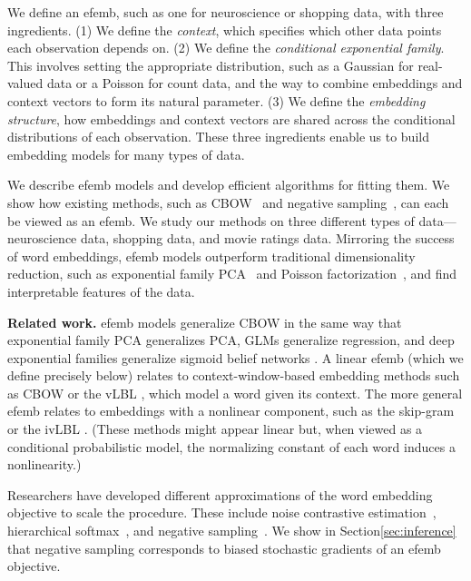 \documentclass[12pt]{article}
\DeclareRobustCommand{\parhead}[1]{\vspace{0.05in} \textbf{#1} }
\begin{document}
We define an \gls{efemb}, such as one for neuroscience or shopping
data, with three ingredients. (1) We define the \textit{context},
which specifies which other data points each observation depends
on. (2) We define the \textit{conditional exponential family}. This
involves setting the appropriate distribution, such as a Gaussian for
real-valued data or a Poisson for count data, and the way to combine
embeddings and context vectors to form its natural parameter.  (3) We
define the \textit{embedding structure}, how embeddings and context
vectors are shared across the conditional distributions of each
observation.  These three ingredients enable us to build embedding
models for many types of data.

We describe \gls{efemb} models and develop efficient algorithms for
fitting them. We show how existing methods, such as
\gls{CBOW}~\citep{mikolov2013efficient} and negative
sampling~\citep{mikolov2013distributed}, can each be viewed as an
\gls{efemb}. We study our methods on three different types of
data---neuroscience data, shopping data, and movie ratings data.
Mirroring the success of word embeddings, \gls{efemb} models
outperform traditional dimensionality reduction, such as exponential family
\gls{PCA}~\citep{collins2001generalization} and Poisson
factorization~\citep{Gopalan2015}, and find interpretable features of
the data.

\parhead{Related work.}  \gls{efemb} models generalize \gls{CBOW}
\citep{mikolov2013efficient} in the same way that exponential family
\gls{PCA} \citep{collins2001generalization} generalizes \gls{PCA},
\glspl{GLM} \citep{mccullagh1989generalized} generalize regression,
and deep exponential families \citep{ranganath2014deep} generalize
sigmoid belief networks \citep{neal1990learning}.  A linear
\gls{efemb} (which we define precisely below) relates to
context-window-based embedding methods such as \gls{CBOW} or the \gls{vLBL}
\citep{mikolov2013efficient,mnih2013learning}, which model a word
given its context. The more general \gls{efemb} relates to embeddings
with a nonlinear component, such as the skip-gram
\citep{mikolov2013efficient} or the \gls{ivLBL} \citep{mnih2013learning}.
(These methods might appear linear but, when viewed as a conditional
probabilistic model, the normalizing constant of each word induces a
nonlinearity.)

Researchers have developed different approximations of the word
embedding objective to scale the procedure.  These include noise
contrastive estimation~\citep{gutmann2010noise,mnih2012fast}, hierarchical
softmax~\citep{mikolov2013distributed}, and negative
sampling~\citep{mikolov2013efficient}.  We show in
Section\nobreakspace \ref {sec:inference} that negative sampling corresponds to biased
stochastic gradients of an \gls{efemb} objective.
\end{document}
